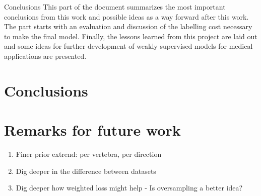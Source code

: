 \begin{partwithabstract}{Conclusions}
    This part of the document summarizes the most important conclusions from this work and possible ideas as a way forward after this work.
    The part starts with an evaluation and discussion of the labelling cost necessary to make the final model. 
    Finally, the lessons learned from this project are laid out and some ideas for further development of weakly supervised models for medical applications are presented. 
\end{partwithabstract}
\restoregeometry

\chapter{Conclusions}

\chapter{Remarks for future work}

\begin{enumerate}
    \item Finer prior extrend: per vertebra, per direction
    \item Dig deeper in the difference between datasets
    \item Dig deeper how weighted loss might help - Is oversampling a better idea?
\end{enumerate}